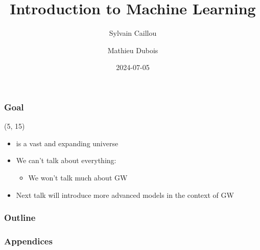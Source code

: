 \documentclass[10pt]{beamer}
\title{Introduction to Machine Learning}
\author{Sylvain Caillou \and Mathieu Dubois}
\institute{L2IT}
\date{2024-07-05}
\begin{document}
\frame{\titlepage}


\begin{frame}
  \frametitle{Goal}

  \begin{textblock}{90}(5, 15)
    \begin{itemize}
    \item {} is a vast and expanding universe 
    \item<3-> We can't talk about everything:
      \begin{itemize}
      \item<4-> We won't talk much about GW
      \end{itemize}
    \item<5-> Next talk will introduce more advanced models in the context of GW
    \end{itemize}
  \end{textblock}
\end{frame}


\begin{frame}
  \frametitle{Outline}
  \tableofcontents[hidesubsections]
\end{frame}







%

\appendix

\begin{frame}
  \frametitle{Appendices}
  \tableofcontents[hidesubsections]
\end{frame}






%
\end{document}
